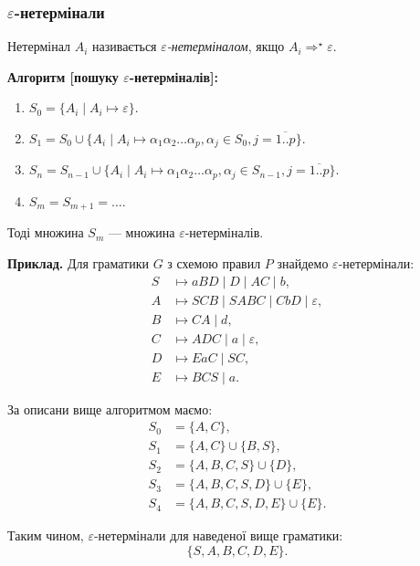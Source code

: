 \subsubsection{\texorpdfstring{$\varepsilon$}{epsilon}-нетермінали}

Нетермінал $A_i$ називається \textit{$\varepsilon$-нетерміналом}, якщо $A_i \Rightarrow^\star \varepsilon$. \medskip

\textbf{Алгоритм [пошуку $\varepsilon$-нетерміналів]:}
\begin{enumerate}
	\item $S_0 = \{A_i \mid A_i \mapsto \varepsilon \}$.
	\item $S_1 = S_0 \cup \{ A_i \mid A_i \mapsto \alpha_1 \alpha_2 \ldots \alpha_p, \alpha_j \in S_0, j = \overline{1..p} \}$.
	\item $S_n = S_{n-1} \cup \{ A_i \mid A_i \mapsto \alpha_1 \alpha_2 \ldots \alpha_p, \alpha_j \in S_{n-1}, j = \overline{1..p} \}$.
	\item $S_m = S_{m + 1} = \ldots$.
\end{enumerate}

Тоді множина $S_m$ --- множина $\varepsilon$-нетерміналів. \medskip

\textbf{Приклад.} Для граматики $G$ з схемою правил $P$ знайдемо $\varepsilon$-не\-тер\-мі\-на\-ли: 
\begin{align}
	S &\mapsto aBD \mid D \mid AC \mid b, \\
	A &\mapsto SCB \mid SABC \mid CbD \mid \varepsilon, \\
	B &\mapsto CA \mid d, \\
	C &\mapsto ADC \mid a \mid \varepsilon, \\
	D &\mapsto EaC \mid SC, \\
	E &\mapsto BCS \mid a.
\end{align}

За описани вище алгоритмом маємо:
\begin{align}
	S_0 &= \{A, C\}, \\
	S_1 &= \{A, C\} \cup \{B, S\}, \\
	S_2 &= \{A, B, C, S\} \cup \{D\}, \\
	S_3 &= \{A, B, C, S, D\} \cup \{E\}, \\
	S_4 &= \{A, B, C, S, D, E\} \cup \{E\}.
\end{align}

Таким чином, $\varepsilon$-нетермінали для наведеної вище граматики:
\begin{equation}
    \{S, A, B, C, D, E\}.
\end{equation}

